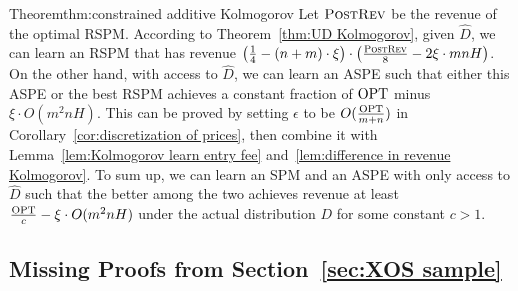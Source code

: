{\begin{prevproof}{Theorem}{thm:constrained additive Kolmogorov}
 Let $\textsc{PostRev}$ be the revenue of the optimal RSPM. According to Theorem~\ref{thm:UD Kolmogorov}, given $\hat{D}$, we can learn an RSPM that has revenue $\left(\frac{1}{4}-(n+m)\cdot \xi \right)\cdot \left(\frac{\textsc{PostRev}}{8}-2\xi\cdot mnH\right)$. On the other hand, with access to $\hat{D}$, we can learn an ASPE such that either this ASPE or the best RSPM achieves a constant fraction of $\text{OPT}$ minus $\xi\cdot O(m^2nH)$. This can be proved by setting $\epsilon$ to be $O(\frac{\text{OPT}}{m+n})$ in Corollary~\ref{cor:discretization of prices}, then combine it with Lemma~\ref{lem:Kolmogorov learn entry fee} and~\ref{lem:difference in revenue Kolmogorov}. To sum up, we can learn an SPM and an ASPE with only access to $\hat{D}$ such that the better among the two achieves revenue at least $\frac{\text{OPT}}{c}-\xi\cdot O(m^2nH)$ under the actual distribution $D$ for some constant $c>1$.
\end{prevproof}
}

\subsection{Missing Proofs from Section~\ref{sec:XOS sample}}\label{sec:XOS bounded}
 
